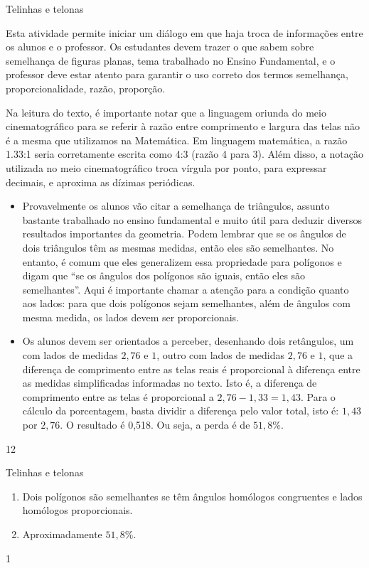 \begin{sugestions}{Telinhas e telonas}
{
Esta atividade permite iniciar um diálogo em que haja troca de informações entre os alunos e o professor. Os estudantes devem trazer o que sabem sobre semelhança de figuras planas, tema trabalhado no Ensino Fundamental, e o professor deve estar atento para garantir o uso correto dos termos semelhança, proporcionalidade, razão, proporção. 

Na leitura do texto, é importante notar que a linguagem oriunda do meio cinematográfico para se referir à razão entre comprimento e largura das telas não é a mesma que utilizamos na Matemática. Em linguagem matemática, a razão 1.33:1 seria corretamente escrita como 4:3 (razão 4 para 3). Além disso, a notação utilizada no meio cinematográfico troca vírgula por ponto, para expressar decimais, e aproxima as dízimas periódicas.

\begin{itemize}
\item Provavelmente os alunos vão citar a semelhança de triângulos, assunto bastante trabalhado no ensino fundamental e muito útil para deduzir diversos resultados importantes da geometria. Podem lembrar que se os ângulos de dois triângulos têm as mesmas medidas, então eles são semelhantes. No entanto, é comum que eles generalizem essa propriedade para polígonos e digam que “se os ângulos dos polígonos são iguais, então eles são semelhantes”. Aqui é importante chamar a atenção para a condição quanto aos lados: para que dois polígonos sejam semelhantes, além de ângulos com mesma medida, os lados devem ser proporcionais.
\item Os alunos devem ser orientados a perceber, desenhando dois retângulos, um com lados de medidas $2{,}76$ e $1$, outro com lados de medidas $2{,}76$ e $1$, que a diferença de comprimento entre as telas reais é proporcional à diferença entre as medidas simplificadas informadas no texto. Isto é, a diferença de comprimento entre as telas é proporcional a $2{,}76 - 1{,}33 = 1,43$. Para o cálculo da porcentagem, basta dividir a diferença pelo valor total, isto é: $1{,}43$ por $2{,}76$. O resultado é 0,518. Ou seja, a perda é de $51,8\%$.

\end{itemize}
}{1}{2}
\end{sugestions}
\begin{answer}{Telinhas e telonas}
{
\begin{enumerate}
\item Dois polígonos são semelhantes se têm ângulos homólogos congruentes e lados homólogos proporcionais. 
\item Aproximadamente $51,8\%$.
\end{enumerate}
}{1}
\end{answer}
